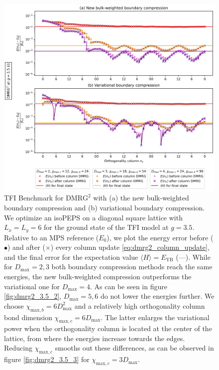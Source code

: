 \newpage
\vspace*{\fill}
\begin{figure}[H]
  \centering
  \includegraphics[width=1.0\linewidth]{dmrg_6_6_3.5_1.png}
  \caption{TFI Benchmark for $\text{DMRG}^2$ with (a) the new bulk-weighted boundary compression and (b) variational boundary compression. We optimize an isoPEPS on a diagonal square lattice with $L_x = L_y = 6$ for the ground state of the TFI model at $g = 3.5$. Relative to an MPS reference ($E_0$), we plot the energy error before ($\bullet$) and after ($\times$) every column update \eqref{eq:dmrg2_column_update}, and the final error for the expectation value $\langle H \rangle = E_{\text{YB}}$ (---). While for $D_{\text{max}} = 2, 3$ both boundary compression methods reach the same energies, the new bulk-weighted compression outperforms the variational one for $D_{\text{max}} = 4$. As can be seen in figure \ref{fig:dmrg2_3.5_2}, $D_{\text{max}} = 5, 6$ do not lower the energies further. We choose $\chi_{\text{max},b} = 6D_{\text{max}}^2$ and a relatively high orthogonality column bond dimension $\chi_{\text{max},c} = 6D_{\text{max}}$. The latter enlarges the variational power when the orthogonality column is located at the center of the lattice, from where the energies increase towards the edges. Reducing $\chi_{\text{max},c}$ smooths out these differences, as can be observed in figure \ref{fig:dmrg2_3.5_3} for $\chi_{\text{max}, c} = 3D_{\text{max}}$.}
\label{fig:dmrg2_3.5_1}
\end{figure}
\vspace*{\fill}

